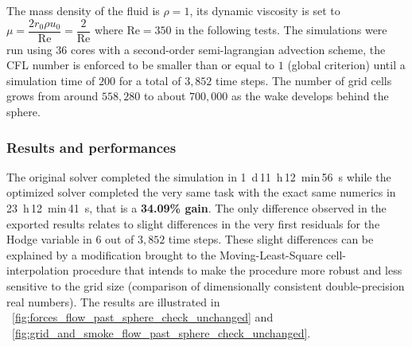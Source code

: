 \documentclass[11pt, a4paper]{article}
\newcommand{\fig}{\figurename \ }
\newcommand{\Reynolds}{\text{Re}}
\theoremstyle{remark}
\begin{document}
The mass density of the fluid is $\rho = 1$, its dynamic viscosity is set to $\mu = \dfrac{2 r_{0}\rho u_{0}}{\Reynolds} = \dfrac{2}{\Reynolds}$ where $\Reynolds = 350$ in the following tests. The simulations were run using $36$ cores with a second-order semi-lagrangian advection scheme, the CFL number is enforced to be smaller than or equal to $1$ (global criterion) until a simulation time of $200$ for a total of $3,852$ time steps. The number of grid cells grows from around $558,280$ to about $700,000$ as the wake develops behind the sphere. 

\subsubsection*{Results and performances}

The original solver completed the simulation in \SI{1}{\day}\,\SI{11}{\hour}\,\SI{12}{\minute}\,\SI{56}{\second} while the optimized solver completed the very same task with the exact same numerics in \SI{23}{\hour}\,\SI{12}{\minute}\,\SI{41}{\second}, that is a \textbf{34.09\% gain}. The only difference observed in the exported results relates to slight differences in the very first residuals for the Hodge variable in $6$ out of $3,852$ time steps. These slight differences can be explained by a modification brought to the Moving-Least-Square cell-interpolation procedure that intends to make the procedure more robust and less sensitive to the grid size (comparison of dimensionally consistent double-precision real numbers). The results are illustrated in \fig \ref{fig:forces_flow_past_sphere_check_unchanged} and \fig \ref{fig:grid_and_smoke_flow_past_sphere_check_unchanged}. 
\end{document}
